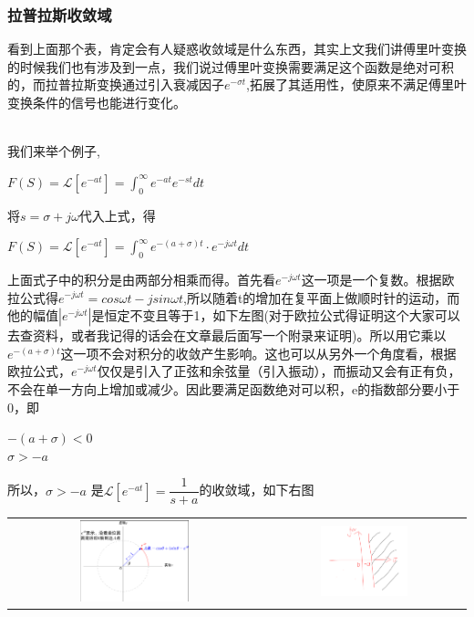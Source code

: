 \documentclass[UTF8,a4paper,12pt]{ctexart}
\begin{document}
  \subsubsection{拉普拉斯收敛域}
  看到上面那个表，肯定会有人疑惑收敛域是什么东西，其实上文我们讲傅里叶变换的时候我们也有涉及到一点，我们说过傅里叶变换需要满足这个函数是绝对可积的，而拉普拉斯变换通过引入衰减因子$e^{-\sigma t}$,拓展了其适用性，使原来不满足傅里叶变换条件的信号也能进行变化。
  
  \begin{notitlebox}
   \\我们来举个例子,
   \begin{center}
      $F(S)=\mathcal{L}[e^{-at}] = \int_0^{\infty}{e^{-at}e^{-st} dt}$
   \end{center}
 
   将$s=\sigma +j\omega $代入上式，得
   \begin{center}
      $F(S)=\mathcal{L}[e^{-at}] = \int_0^{\infty}{e^{-(a+\sigma )t} \cdot e^{-j\omega t} dt}$
   \end{center}
   上面式子中的积分是由两部分相乘而得。首先看$e^{-j \omega t}$这一项是一个复数。根据欧拉公式得$e^{-j \omega t}=cos{\omega t} -j sin{\omega t}$,所以随着t的增加在复平面上做顺时针的运动，而他的幅值$|e^{-j \omega t}|$是恒定不变且等于1，如下左图(对于欧拉公式得证明这个大家可以去查资料，或者我记得的话会在文章最后面写一个附录来证明)。所以用它乘以$e^{-(a+\sigma )t}$这一项不会对积分的收敛产生影响。这也可以从另外一个角度看，根据欧拉公式，$e^{-j \omega t}$仅仅是引入了正弦和余弦量（引入振动），而振动又会有正有负，不会在单一方向上增加或减少。因此要满足函数绝对可以积，e的指数部分要小于0，即
   \begin{center}
    $-(a+\sigma)<0$
    \\$\sigma > -a$    
   \end{center}

   所以，$\sigma > -a$ 是$\mathcal{L}[e^{-at}]=\dfrac{1}{s+a}$的收敛域，如下右图
   \\
   \begin{tabular}{cc}
    \includegraphics[width=0.45\textwidth]{picture/oula.png} &
    \includegraphics[width=0.45\textwidth]{picture/shoulianyu.png} \\
\end{tabular}
  \end{notitlebox}
\end{document}
